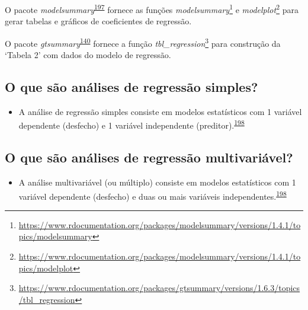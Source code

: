 \documentclass[
  a4paper,
]{book}
\providecommand{\tightlist}{%
  \setlength{\itemsep}{0pt}\setlength{\parskip}{0pt}}
\renewcommand{\href}[2]{#2\footnote{\url{#1}}}
\newenvironment{infobox}[1]
  {
  \begin{itemize}
  \renewcommand{\labelitemi}{
    \raisebox{-.7\height}[0pt][0pt]{
      {\setkeys{Gin}{width=3em,keepaspectratio}
        \texttt{[image: \#1]}}
    }
  }
  \setlength{\fboxsep}{1em}
  \begin{blackbox}
  \item
  }
  {
  \end{blackbox}
  \end{itemize}
  }
\begin{document}
\begin{infobox}{images/Rlogo}
O pacote \emph{modelsummary}\textsuperscript{\protect\hyperlink{ref-modelsummary}{197}} fornece as funções \href{https://www.rdocumentation.org/packages/modelsummary/versions/1.4.1/topics/modelsummary}{\emph{modelsummary}} e \href{https://www.rdocumentation.org/packages/modelsummary/versions/1.4.1/topics/modelplot}{\emph{modelplot}} para gerar tabelas e gráficos de coeficientes de regressão.

\end{infobox}

\begin{infobox}{images/Rlogo}
O pacote \emph{gtsummary}\textsuperscript{\protect\hyperlink{ref-gtsummary-2}{140}} fornece a função \href{https://www.rdocumentation.org/packages/gtsummary/versions/1.6.3/topics/tbl_regression}{\emph{tbl\_regression}} para construção da `Tabela 2' com dados do modelo de regressão.

\end{infobox}

\hypertarget{o-que-suxe3o-anuxe1lises-de-regressuxe3o-simples}{%
\subsection{O que são análises de regressão simples?}\label{o-que-suxe3o-anuxe1lises-de-regressuxe3o-simples}}

\begin{itemize}
\tightlist
\item
  A análise de regressão simples consiste em modelos estatísticos com 1 variável dependente (desfecho) e 1 variável independente (preditor).\textsuperscript{\protect\hyperlink{ref-Hidalgo2013}{198}}
\end{itemize}

\hypertarget{o-que-suxe3o-anuxe1lises-de-regressuxe3o-multivariuxe1vel}{%
\subsection{O que são análises de regressão multivariável?}\label{o-que-suxe3o-anuxe1lises-de-regressuxe3o-multivariuxe1vel}}

\begin{itemize}
\tightlist
\item
  A análise multivariável (ou múltiplo) consiste em modelos estatísticos com 1 variável dependente (desfecho) e duas ou mais variáveis independentes.\textsuperscript{\protect\hyperlink{ref-Hidalgo2013}{198}}
\end{itemize}
\end{document}

